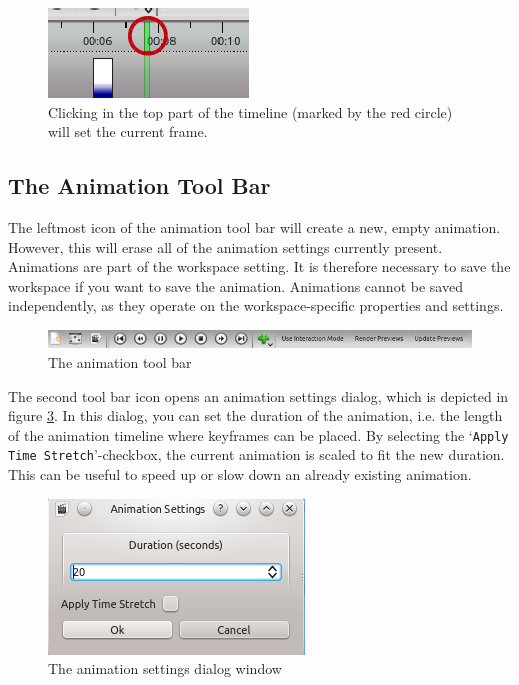 \begin{figure}[htb]
 \centering
 \includegraphics[scale=0.8,keepaspectratio=true]{./images/animation_marker1.png}
 \caption{Clicking in the top part of the timeline (marked by the red circle) will set the current frame.}
 \label{fig:animation_marker}
\end{figure}

\subsection*{The Animation Tool Bar}

The leftmost icon of the animation tool bar will create a new, empty animation. However, this will erase all of the animation settings currently 
present. Animations are part of the workspace setting. It is therefore necessary to save the workspace if you want to save the animation. Animations
cannot be saved independently, as they operate on the workspace-specific properties and settings.

\begin{figure}[!htb]
 \centering
 \includegraphics[scale=0.7,keepaspectratio=true]{./images/animation_toolbar.png}
 \caption{The animation tool bar}
 \label{fig:animation_toolbar}
\end{figure}

The second tool bar icon opens an animation settings dialog, which is depicted in figure \ref{fig:animation_settings}. In this dialog, you can set the duration
of the animation, i.e. the length of the animation timeline where keyframes can be placed. By selecting the `\verb|Apply Time Stretch|'-checkbox, the current
animation is scaled to fit the new duration. This can be useful to speed up or slow down an already existing animation.

\begin{figure}[htb]
 \centering
 \includegraphics[scale=0.7,keepaspectratio=true]{./images/animation_settings.png}
 \caption{The animation settings dialog window}
 \label{fig:animation_settings}
\end{figure}

